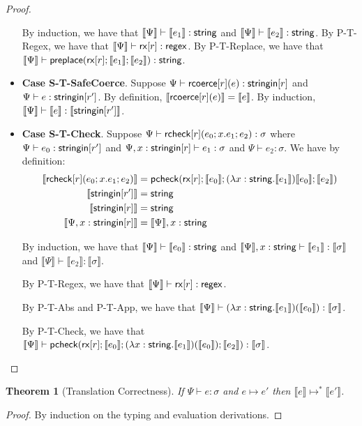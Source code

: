 \documentclass[11pt,leqno]{article}
\newtheorem{thm}{Theorem}
\theoremstyle{definition}
\newcommand{\rcoerce}[2]{{\sf rcoerce}[#1](#2)}
\newcommand{\rcheck}[4]{ {\sf rcheck}[#1](#2;#3;#4) }
\newcommand{\stringin}[1]{{\sf stringin}[#1]}
\newcommand{\tcheck}[4]{{\sf pcheck}(#1; #2; #3; #4)}
\newcommand{\preplace}[3]{{\sf preplace}(#1;#2;#3)}
\newcommand{\rx}[1]{ {\sf rx}[#1] }
\newcommand{\str}{{\sf string}}
\newcommand{\regex}{{\sf regex}}
\newcommand{\sctx}{\Psi} %
\newcommand{\trden}[1]{\llbracket #1 \rrbracket} %
\begin{document}
\begin{proof}
\begin{itemize}[label=$ $,itemsep=1ex]
By induction, we have that $\trden{\sctx} \vdash \trden{e_1} : \str$ and $\trden{\sctx} \vdash \trden{e_2} : \str$. By P-T-Regex, we have that $\trden{\sctx} \vdash \rx{r} : \regex$. By P-T-Replace, we have that $\trden{\sctx} \vdash \preplace{\rx{r}}{\trden{e_1}}{\trden{e_2}} : \str$.

\item \textbf{Case S-T-SafeCoerce}.
Suppose $\sctx \vdash \rcoerce{r}{e} : \stringin{r}$ and $\sctx \vdash e : \stringin{r'}$. By definition, $\trden{ \rcoerce{r}{e} } = \trden{e}$.
By induction, $\trden{\sctx} \vdash \trden{e} : \trden{\stringin{r'}}$.

\item \textbf{Case S-T-Check}.
Suppose $\sctx \vdash \rcheck{r}{e_0}{x.e_1}{e_2} : \sigma$ where
$\sctx \vdash e_0 : \stringin{r'}$ and 
$\sctx, x : \stringin{r} \vdash e_1 : \sigma$ and
$\sctx \vdash e_2 : \sigma$. We have by definition:
\begin{align*}
\trden{\rcheck{r}{e_0}{x.e_1}{e_2}} &= \tcheck{\rx{r}}{\trden{e_0}}{(\lambda x : \str.\trden{e_1}) \trden{e_0}}{\trden{e_2}}\\
\trden{\stringin{r'}} &= \str\\
\trden{\stringin{r}} &= \str\\
\trden{\sctx, x : \stringin{r}} &= \trden{\sctx}, x : \str
\end{align*}

By induction, we have that $\trden{\sctx} \vdash \trden{e_0} : \str$ and $\trden{\sctx}, x : \str \vdash \trden{e_1} : \trden{\sigma}$ and $\trden{\sctx} \vdash \trden{e_2} : \trden{\sigma}$.

By P-T-Regex, we have that $\trden{\sctx} \vdash \rx{r} : \regex$.

By P-T-Abs and P-T-App, we have that $\trden{\sctx} \vdash (\lambda x : \str.\trden{e_1})(\trden{e_0}) : \trden{\sigma}$.

By P-T-Check, we have that $\trden{\sctx} \vdash \tcheck{\rx{r}}{\trden{e_0}}{(\lambda x : \str.\trden{e_1})(\trden{e_0})}{\trden{e_2}} : \trden{\sigma}$.

\end{itemize}



\end{proof}

\begin{thm}[Translation Correctness]
If $\sctx \vdash e : \sigma$ and $e \mapsto e'$ then $\trden{e} \mapsto^* \trden{e'}$.
\end{thm}
\begin{proof}
By induction on the typing and evaluation derivations.
\end{proof}
\end{document}
